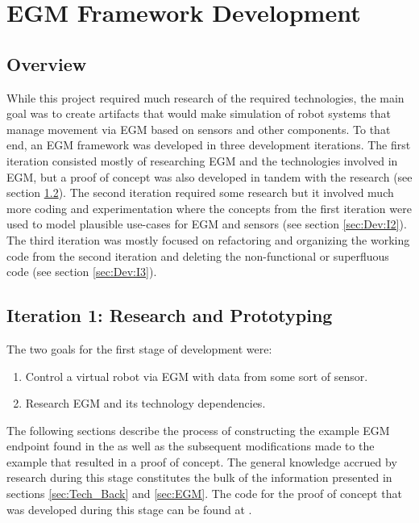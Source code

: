 \documentclass{cslthse-msc}
\begin{document}
\chapter{EGM Framework Development}
\label{sec:Dev}

\section{Overview}
\label{sec:Dev:Overview}
While this project required much research of the required technologies, the main goal was to create artifacts that would make simulation of robot systems that manage movement via EGM based on sensors and other components. To that end, an EGM framework was developed in three development iterations. The first iteration consisted mostly of researching EGM and the technologies involved in EGM, but a proof of concept was also developed in tandem with the research (see section \ref{sec:Dev:I1}). The second iteration required some research but it involved much more coding and experimentation where the concepts from the first iteration were used to model plausible use-cases for EGM and sensors (see section \ref{sec:Dev:I2}). The third iteration was mostly focused on refactoring and organizing the working code from the second iteration and deleting the non-functional or superfluous code (see section \ref{sec:Dev:I3}). 

\section{Iteration 1: Research and Prototyping}
\label{sec:Dev:I1}
The two goals for the first stage of development were:
\begin{enumerate}
    \item Control a virtual robot via EGM with data from some sort of sensor.
    \item Research EGM and its technology dependencies.
\end{enumerate} 

The following sections describe the process of constructing the example EGM endpoint found in the \cite[Sec. 9.3.3]{ABB:controller_software} as well as the subsequent modifications made to the example that resulted in a proof of concept. The general knowledge accrued by research during this stage constitutes the bulk of the information presented in sections \ref{sec:Tech_Back} and \ref{sec:EGM}. The code for the proof of concept that was developed during this stage can be found at \cite{Greg:Sensor}. 
\end{document}
